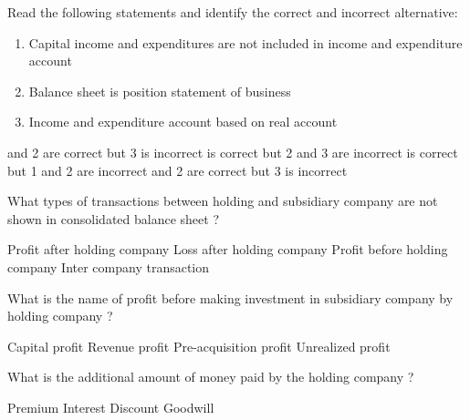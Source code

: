 \begin{questions}
\question Read the following statements and identify the correct and incorrect alternative:
  \begin{enumerate}
  \item Capital income and expenditures are not included in income and expenditure account
  \item Balance sheet is position statement of business
  \item Income and expenditure account based on real account
  \end{enumerate}
  \begin{choices}
   and 2 are correct but 3 is incorrect
   is correct but 2 and 3 are incorrect
   is correct but 1 and 2 are incorrect
   and 2 are correct but 3 is incorrect
  \end{choices}

\question What types of transactions between holding and subsidiary company are not shown in consolidated balance sheet ?
  \begin{choices}
  \choice Profit after holding company
  \choice Loss after holding company
  \choice Profit before holding company
  \choice Inter company transaction
  \end{choices}

\question What is the name of profit before making investment in subsidiary company by holding company ?
  \begin{choices}
  \choice Capital profit
  \choice Revenue profit
  \choice Pre-acquisition profit
  \choice Unrealized profit
  \end{choices}

\question What is the additional amount of money paid by the holding company ?
  \begin{choices}
  \choice Premium
  \choice Interest
  \choice Discount
  \choice Goodwill
  \end{choices}

\question
  \begin{choices}
  \choice
  \choice
  \choice
  \choice
  \end{choices}

\question
  \begin{choices}
  \choice
  \choice
  \choice
  \choice
  \end{choices}

\question
  \begin{choices}
  \choice
  \choice
  \choice
  \choice
  \end{choices}


\end{questions}
